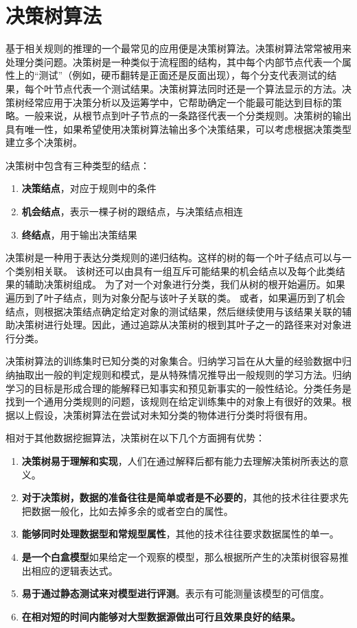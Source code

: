\section{决策树算法}

基于相关规则的推理的一个最常见的应用便是决策树算法。决策树算法常常被用来处理分类问题。决策树是一种类似于流程图的结构，其中每个内部节点代表一个属性上的“测试”（例如，硬币翻转是正面还是反面出现），每个分支代表测试的结果，每个叶节点代表一个测试结果。决策树算法同时还是一个算法显示的方法。决策树经常应用于决策分析以及运筹学中，它帮助确定一个能最可能达到目标的策略。一般来说，从根节点到叶子节点的一条路径代表一个分类规则。决策树的输出具有唯一性，如果希望使用决策树算法输出多个决策结果，可以考虑根据决策类型建立多个决策树。

决策树中包含有三种类型的结点：

\begin{enumerate}
  \item \textbf{决策结点}，对应于规则中的条件
  \item \textbf{机会结点}，表示一棵子树的跟结点，与决策结点相连
  \item \textbf{终结点}，用于输出决策结果
\end{enumerate}

决策树是一种用于表达分类规则的递归结构。这样的树的每一个叶子结点可以与一个类别相关联。 该树还可以由具有一组互斥可能结果的机会结点以及每个此类结果的辅助决策树组成。 为了对一个对象进行分类，我们从树的根开始遍历。如果遍历到了叶子结点，则为对象分配与该叶子关联的类。 或者，如果遍历到了机会结点，则根据决策结点确定给定对象的测试结果，然后继续使用与该结果关联的辅助决策树进行处理。因此，通过追踪从决策树的根到其叶子之一的路径来对对象进行分类。

决策树算法的训练集时已知分类的对象集合。归纳学习旨在从大量的经验数据中归纳抽取出一般的判定规则和模式，是从特殊情况推导出一般规则的学习方法。归纳学习的目标是形成合理的能解释已知事实和预见新事实的一般性结论。分类任务是找到一个通用分类规则的问题，该规则在给定训练集中的对象上有很好的效果。根据以上假设，决策树算法在尝试对未知分类的物体进行分类时将很有用。

相对于其他数据挖掘算法，决策树在以下几个方面拥有优势：

\begin{enumerate}
  \item \textbf{决策树易于理解和实现}，人们在通过解释后都有能力去理解决策树所表达的意义。
  \item \textbf{对于决策树，数据的准备往往是简单或者是不必要的}，其他的技术往往要求先把数据一般化，比如去掉多余的或者空白的属性。
  \item \textbf{能够同时处理数据型和常规型属性}，其他的技术往往要求数据属性的单一。
  \item \textbf{是一个白盒模型}如果给定一个观察的模型，那么根据所产生的决策树很容易推出相应的逻辑表达式。
  \item \textbf{易于通过静态测试来对模型进行评测}。表示有可能测量该模型的可信度。
  \item \textbf{在相对短的时间内能够对大型数据源做出可行且效果良好的结果。}
\end{enumerate}

